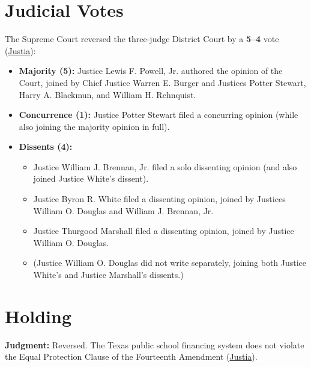 \documentclass[12pt]{article}
\begin{document}
\section{Judicial Votes}

The Supreme Court reversed the three-judge District Court by a \textbf{5--4} vote (\href{https://supreme.justia.com/cases/federal/us/411/1/}{Justia}):
\begin{itemize}
\item \textbf{Majority (5):} Justice Lewis F. Powell, Jr. authored the opinion of the Court, joined by Chief Justice Warren E. Burger and Justices Potter Stewart, Harry A. Blackmun, and William H. Rehnquist.
\item \textbf{Concurrence (1):} Justice Potter Stewart filed a concurring opinion (while also joining the majority opinion in full).
\item \textbf{Dissents (4):}
  \begin{itemize}
  \item Justice William J. Brennan, Jr. filed a solo dissenting opinion (and also joined Justice White's dissent).
  \item Justice Byron R. White filed a dissenting opinion, joined by Justices William O. Douglas and William J. Brennan, Jr.
  \item Justice Thurgood Marshall filed a dissenting opinion, joined by Justice William O. Douglas.
  \item (Justice William O. Douglas did not write separately, joining both Justice White's and Justice Marshall's dissents.)
  \end{itemize}
\end{itemize}

\section{Holding}

\textbf{Judgment:} Reversed. The Texas public school financing system does not violate the Equal Protection Clause of the Fourteenth Amendment (\href{https://supreme.justia.com/cases/federal/us/411/1/}{Justia}).
\end{document}
